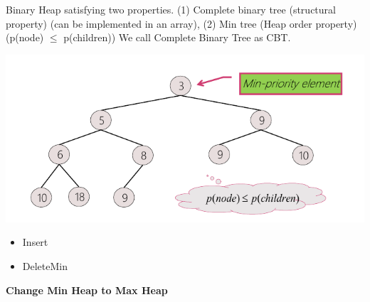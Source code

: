 \begin{section}
Binary Heap satisfying two properties.
(1) Complete binary tree (structural property) (can be implemented in an array), (2) Min tree (Heap order property) (p(node) $\le$ p(children))
\small{We call Complete Binary Tree as CBT.}

\begin{center}
    \includegraphics*[]{img/Meanheap.png}
\end{center}

\begin{itemize}
    \item Insert
    \item DeleteMin
\end{itemize}

\textbf{Change Min Heap to Max Heap}

\bigskip
\end{section}
